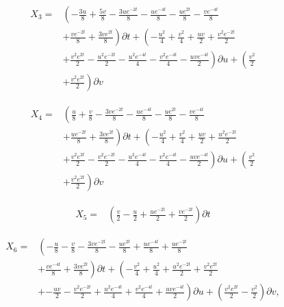 \begin{align*}
X_{3}=&\left(- \frac{3 u}{8}+\frac{5 v}{8}- \frac{3 u e^{- 2 t}}{8}- \frac{u e^{- 4 t}}{8}- \frac{u e^{2 t}}{8}- \frac{v e^{- 4 t}}{8}\right.\\
&+\left.\frac{v e^{- 2 t}}{8}+\frac{3 v e^{2 t}}{8} \right)\partial t+\left(- \frac{u^{2}}{4}+\frac{v^{2}}{4}+\frac{u v}{2}+\frac{v^{2} e^{- 2 t}}{2}\right.\\
&+\left.\frac{v^{2} e^{2 t}}{2}- \frac{u^{2} e^{- 2 t}}{2}- \frac{u^{2} e^{- 4 t}}{4}- \frac{v^{2} e^{- 4 t}}{4}- \frac{u v e^{- 4 t}}{2} \right)\partial u+\left(\frac{v^{2}}{2}\right.\\
&+\left.\frac{v^{2} e^{2 t}}{2} \right)\partial v
\end{align*}

\begin{align*}
X_{4}=&\left(\frac{u}{8}+\frac{v}{8}- \frac{3 v e^{- 2 t}}{8}- \frac{u e^{- 4 t}}{8}- \frac{u e^{2 t}}{8}- \frac{v e^{- 4 t}}{8}\right.\\
&+\left.\frac{u e^{- 2 t}}{8}+\frac{3 v e^{2 t}}{8} \right)\partial t+\left(- \frac{u^{2}}{4}+\frac{v^{2}}{4}+\frac{u v}{2}+\frac{u^{2} e^{- 2 t}}{2}\right.\\
&+\left.\frac{v^{2} e^{2 t}}{2}- \frac{v^{2} e^{- 2 t}}{2}- \frac{u^{2} e^{- 4 t}}{4}- \frac{v^{2} e^{- 4 t}}{4}- \frac{u v e^{- 4 t}}{2} \right)\partial u+\left(\frac{v^{2}}{2}\right.\\
&+\left.\frac{v^{2} e^{2 t}}{2} \right)\partial v
\end{align*}

\begin{align*}
X_{5}=&\left(\frac{v}{2}- \frac{u}{2}+\frac{u e^{- 2 t}}{2}+\frac{v e^{- 2 t}}{2} \right)\partial t
\end{align*}

\begin{align*}
X_{6}=&\left(- \frac{u}{8}- \frac{v}{8}- \frac{3 v e^{- 2 t}}{8}- \frac{u e^{2 t}}{8}+\frac{u e^{- 4 t}}{8}+\frac{u e^{- 2 t}}{8}\right.\\
&+\left.\frac{v e^{- 4 t}}{8}+\frac{3 v e^{2 t}}{8} \right)\partial t+\left(- \frac{v^{2}}{4}+\frac{u^{2}}{4}+\frac{u^{2} e^{- 2 t}}{2}+\frac{v^{2} e^{2 t}}{2}\right.\\
&+\left.- \frac{u v}{2}- \frac{v^{2} e^{- 2 t}}{2}+\frac{u^{2} e^{- 4 t}}{4}+\frac{v^{2} e^{- 4 t}}{4}+\frac{u v e^{- 4 t}}{2} \right)\partial u+\left(\frac{v^{2} e^{2 t}}{2} - \frac{v^{2}}{2} \right)\partial v,\\
\end{align*}


